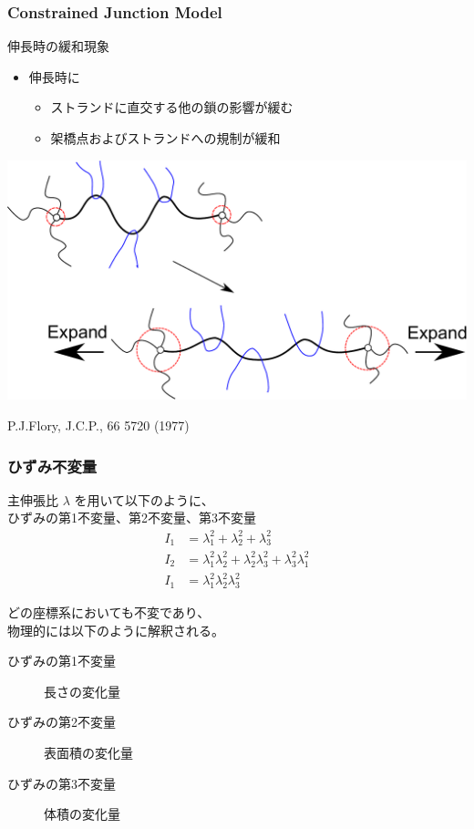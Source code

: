 \documentclass[12pt, dvipdfmx]{beamer}
\newcommand{\backupend}{
   \addtocounter{framenumberappendix}{-\value{framenumber}}
   \addtocounter{framenumber}{\value{framenumberappendix}} 
}
\begin{document}
\begin{frame}
    \frametitle{Constrained Junction Model}
	\begin{exampleblock}{伸長時の緩和現象}
		\begin{itemize}
			\item 伸長時に
			\begin{itemize}
				\item ストランドに直交する他の鎖の影響が緩む
				\item 架橋点およびストランドへの規制が緩和
			\end{itemize}
		\end{itemize}
		\begin{center}
			\includegraphics[width=.7\textwidth]{Constrained_Juntion.pdf}

			P.J.Flory, J.C.P., 66 5720 (1977)
		\end{center}
	\end{exampleblock}
\end{frame}		

\begin{frame}
	\frametitle{ひずみ不変量}

	主伸張比 $\lambda$ を用いて以下のように、\\ひずみの第1不変量、第2不変量、第3不変量
		\begin{align*}
			I_1 &= \lambda_1^2 + \lambda_2^2 + \lambda_3^2 \\
			I_2 &= \lambda_1^2\lambda_2^2 + \lambda_2^2\lambda_3^2 + \lambda_3^2\lambda_1^2 \\
			I_1 &= \lambda_1^2\lambda_2^2\lambda_3^2
		\end{align*}

	どの座標系においても不変であり、\\物理的には以下のように解釈される。
	\begin{description}
		\item [ひずみの第1不変量]
		長さの変化量
		\item [ひずみの第2不変量]
		表面積の変化量
		\item [ひずみの第3不変量]
		体積の変化量
	\end{description}
\end{frame}

\backupend
\end{document}
